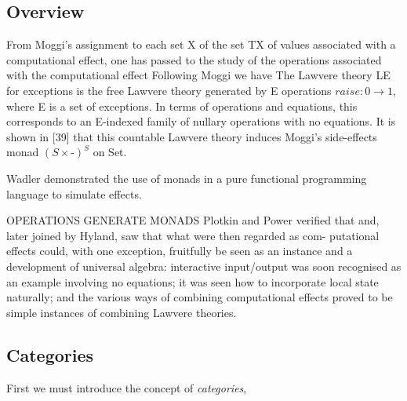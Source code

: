 \documentclass[a4paper,10pt]{article}
\theoremstyle{definition}
\begin{document}
\subsection{Overview}
From Moggi’s assignment to each set X of the set TX of values associated with a computational effect,
one has passed to the study of the operations associated with the computational effect
\cite{hyland2007category}
Following Moggi we have \cite{plotkin2001adequacy}
The Lawvere theory LE for exceptions is the free Lawvere theory generated by E operations $raise : 0 \rightarrow  1$,
where E is a set of exceptions.
In terms of operations and equations,
this corresponds to an E-indexed family of nullary operations with no equations.
It is shown in [39]
that this countable Lawvere theory induces Moggi’s side-effects monad $(S \times \textrm{-})^S$ on
Set.
\cite{hyland2007category}

Wadler \cite{wadler1990comprehending} demonstrated the use of monads in a pure
functional programming language to simulate effects.

OPERATIONS GENERATE MONADS \cite{plotkin2001adequacy}
Plotkin and Power verified that and, later joined by Hyland, saw that what were then regarded as com- putational effects could, with one exception, fruitfully be seen as an instance and a development of universal algebra: interactive input/output was soon recognised as an example involving no equations; it was seen how to incorporate local state naturally; and the various ways of combining computational effects proved to be simple instances of combining Lawvere theories.


\subsection{Categories}
First we must introduce the concept of \textit{categories},
\end{document}

